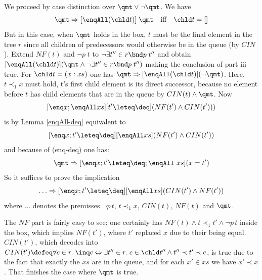We proceed by case distinction over $\qmt \lor\lnot \qmt$. We have 
\[ \qmt \Rightarrow [\enqAll (\chld t)]\;\qmt \quad\text{iff}\quad \chld t = []
\]
 But in this case, \IE when $\qmt$ holds in the box, $t$
must be the final element in the tree $r$ since all children of predecessors
would otherwise be in the queue (by $CIN$). Extend $NF(t)$ and $\lnot p\;t$ to $\lnot \exists
t''\in r\bnd p\;t''$ and obtain $[\enqAll (\chld t)](\qmt \land \lnot \exists t''\in r\bnd
p\;t'')$ making the conclusion of part iii true. For $\chld t = (x:xs)$
one has $\qmt \Rightarrow [\enqAll (\chld t)](\lnot \qmt)$. Here, $t \prec_1 x$ must hold, \IE
t's first child element is its direct successor, because no element before $t$
has child elements that are in the queue by $CIN(t) \land \qmt$.  Now
\[
[\enq x; \enqAll xs][t' \leteq \deq](NF(t') \land CIN(t')))
\]
is by Lemma \ref{enqAll-deq} equivalent to 
\[
[\enq x; t' \leteq \deq][\enqAll xs](NF(t') \land CIN(t'))
\]
and because of (enq-deq) one has:
\[
\qmt \Rightarrow [\enq x; t' \leteq \deq; \enqAll\ xs](x = t')
\]
So it suffices to prove the implication
\[ 
\ldots \Rightarrow [\enq x; t'\leteq\deq][\enqAll xs](CIN(t') \land NF(t'))
\]
where $\ldots$ denotes the premisses $\lnot p\,t$, $t {\prec}_1 x$, $CIN(t)$, $NF(t)$ and
$\qmt$.

The $NF$ part is fairly easy to see: one certainly has $NF(t) \land t {\prec}_1 t' \land \lnot
p\,t$ inside the box, which implies $NF(t')$, where $t'$ replaced $x$ due to
their being equal.  $CIN(t')$, which decodes into $CIN(t') \defeq
\forall c\in r.\; \inq c \Leftrightarrow \exists t'' \in r.\; c\in \chld t'' \land t'' \prec t' \prec c$, is true due to the
fact that exactly the $xs$ are in the queue, and for each $x' \in xs$ we have $x'
{\prec} x$. That finishes the case where $\qmt$ is true.

